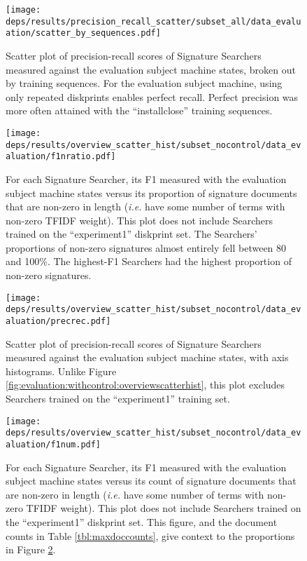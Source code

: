 \documentclass[11pt]{ucthesis}
\theoremstyle{plain}
\theoremstyle{definition}
\newcommand{\ie}{\emph{i.e.}\xspace}
\begin{document}
\begin{figure}
\begin{center}
\texttt{[image: deps/results/precision\_recall\_scatter/subset\_all/data\_evaluation/scatter\_by\_sequences.pdf]}
\caption{\label{fig:spbo:withcontrol:sequences}Scatter plot of precision-recall scores of Signature Searchers measured against the evaluation subject machine states, broken out by training sequences.  For the evaluation subject machine, using only repeated diskprints enables perfect recall.  Perfect precision was more often attained with the ``installclose'' training sequences.}
\end{center}
\end{figure}

\begin{figure}
  \centering
  \texttt{[image: deps/results/overview\_scatter\_hist/subset\_nocontrol/data\_evaluation/f1nratio.pdf]}
  \caption{\label{fig:evaluation:overviewscatterhist:doclens:f1nratio}For each Signature Searcher, its F1 measured with the evaluation subject machine states versus its proportion of signature documents that are non-zero in length (\ie have some number of terms with non-zero TFIDF weight).  This plot does not include Searchers trained on the ``experiment1'' diskprint set.  The Searchers' proportions of non-zero signatures almost entirely fell between 80 and 100\%.  The highest-F1 Searchers had the highest proportion of non-zero signatures.}
\end{figure}

\begin{figure}
\begin{center}
\texttt{[image: deps/results/overview\_scatter\_hist/subset\_nocontrol/data\_evaluation/precrec.pdf]}
\caption{\label{fig:evaluation:nocontrol:overviewscatterhist}Scatter plot of precision-recall scores of Signature Searchers measured against the evaluation subject machine states, with axis histograms.  Unlike Figure \ref{fig:evaluation:withcontrol:overviewscatterhist}, this plot excludes Searchers trained on the ``experiment1'' training set.}
\end{center}
\end{figure}

\begin{figure}
  \centering
  \texttt{[image: deps/results/overview\_scatter\_hist/subset\_nocontrol/data\_evaluation/f1num.pdf]}
  \caption{\label{fig:evaluation:overviewscatterhist:doclens:f1num}For each Signature Searcher, its F1 measured with the evaluation subject machine states versus its count of signature documents that are non-zero in length (\ie have some number of terms with non-zero TFIDF weight).  This plot does not include Searchers trained on the ``experiment1'' diskprint set.  This figure, and the document counts in Table \ref{tbl:maxdoccounts}, give context to the proportions in Figure \ref{fig:evaluation:overviewscatterhist:doclens:f1nratio}.}
\end{figure}
\end{document}
